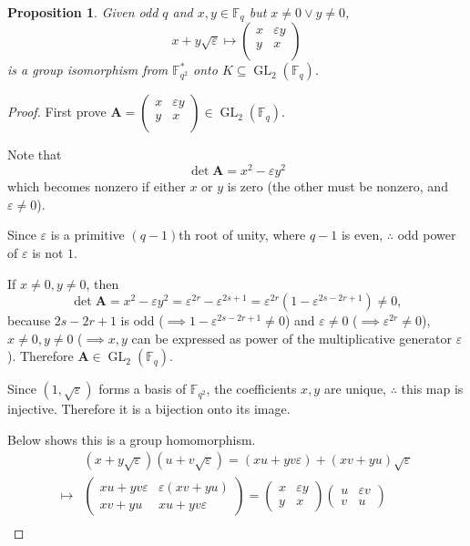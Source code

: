 \documentclass[12pt, letterpaper]{article}
\newcommand{\field}{\mathbb{F}}
\newcommand{\GL}{\operatorname{GL}}
\newcommand{\bfA}{\mathbf{A}}
\newtheorem{prop}{Proposition}[section]
\theoremstyle{definition}
\theoremstyle{remark}
\theoremstyle{definition}
\theoremstyle{plain}
\numberwithin{equation}{section}
\begin{document}
	\begin{prop}
		Given odd $q$ and $x,y\in \field_q$ but $x\ne0\lor y\ne0$,
		\[x+y\sqrt{\varepsilon} \mapsto \begin{pmatrix}
			x&\varepsilon y\\y&x\\
		\end{pmatrix}\] is a group isomorphism from $\field_{q^2}^*$ onto $K\subseteq\GL_2(\field_q)$.
	\end{prop}
	\begin{proof}
		First prove $\bfA=\begin{pmatrix}
			x&\varepsilon y\\y&x\\
		\end{pmatrix}\in\GL_2(\field_q)$.
	
		Note that
		\[\det\bfA=x^2-\varepsilon y^2\]
		which becomes nonzero if either $x$ or $y$ is zero (the other must be nonzero, and $\varepsilon\ne0$).

		Since $\varepsilon$ is a primitive $(q-1)$th root of unity, where $q-1$ is even,
		$\therefore$ odd power of $\varepsilon$ is not $1$.
		
		If $x\ne0,y\ne0$, then
		\[\det\bfA=x^2-\varepsilon y^2=\varepsilon^{2r}-\varepsilon^{2s+1}=
		\varepsilon^{2r}(1-\varepsilon^{2s-2r+1})\ne0, \]
		because $2s-2r+1$ is odd ($\implies 1-\varepsilon^{2s-2r+1}\ne0$)
		and $\varepsilon\ne0$ ($\implies\varepsilon^{2r}\ne0$),
		$x\ne0,y\ne0$ ($\implies x,y$ can be expressed as power of the multiplicative generator $\varepsilon$).
		Therefore $\bfA\in\GL_2(\field_q)$.
		
		Since $(1,\sqrt{\varepsilon})$ forms a basis of $\field_{q^2}$,
		the coefficients $x,y$ are unique,
		$\therefore$ this map is injective.
		Therefore it is a bijection onto its image.
		
		Below shows this is a group homomorphism.
		\[\begin{aligned}
			&(x+y\sqrt{\varepsilon} )(u+v\sqrt{\varepsilon} )=
			(xu+yv\varepsilon) + (xv+yu)\sqrt{\varepsilon}\\
			\mapsto&
			\begin{pmatrix}
				xu+yv\varepsilon&\varepsilon(xv+yu)\\
				xv+yu&xu+yv\varepsilon
			\end{pmatrix}
			= \begin{pmatrix}
				x&\varepsilon y\\
				y&x
			\end{pmatrix}\begin{pmatrix}
			u&\varepsilon v\\
			v&u
		\end{pmatrix}\\
		\end{aligned} 
		 \]
	\end{proof}
\end{document}
